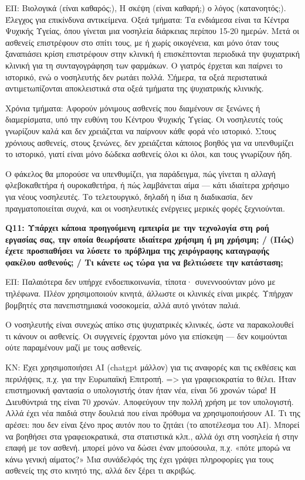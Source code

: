 ΕΠ: Βιολογικά (είναι καθαρός;),
Η σκέψη (είναι καθαρή;) ο λόγος (κατανοητός;).
Έλεγχος για επικίνδυνα αντικείμενα.
Οξεά τμήματα: Τα ενδιάμεσα είναι τα Κέντρα Ψυχικής Υγείας, όπου γίνεται μια νοσηλεία διάρκειας περίπου 15-20 ημερών. Μετά οι ασθενείς επιστρέφουν στο σπίτι τους, με ή χωρίς οικογένεια, και μόνο όταν τους ξαναπιάσει κρίση επιστρέφουν στην κλινική ή επισκέπτονται περιοδικά την ψυχιατρική κλινική για τη συνταγογράφηση των φαρμάκων.
Ο γιατρός έρχεται και παίρνει το ιστορικό, ενώ ο νοσηλευτής δεν ρωτάει πολλά. Σήμερα, τα οξεά περιστατικά αντιμετωπίζονται αποκλειστικά στα οξεά τμήματα της ψυχιατρικής κλινικής.

Χρόνια τμήματα: Αφορούν μόνιμους ασθενείς που διαμένουν σε ξενώνες ή διαμερίσματα, υπό την ευθύνη του Κέντρου Ψυχικής Υγείας. Οι νοσηλευτές τούς γνωρίζουν καλά και δεν χρειάζεται να παίρνουν κάθε φορά νέο ιστορικό. Στους χρόνιους ασθενείς, στους ξενώνες, δεν χρειάζεται κάποιος βοηθός για να υπενθυμίζει το ιστορικό, γιατί είναι μόνο δώδεκα ασθενείς όλοι κι όλοι, και τους γνωρίζουν ήδη.

Ο φάκελος θα μπορούσε να υπενθυμίζει, για παράδειγμα, πώς γίνεται η αλλαγή φλεβοκαθετήρα ή ουροκαθετήρα, ή πώς λαμβάνεται αίμα — κάτι ιδιαίτερα χρήσιμο για νέους νοσηλευτές.
Το τελετουργικό, δηλαδή η ίδια η διαδικασία, δεν πραγματοποιείται συχνά, και οι νοσηλευτικές ενέργειες μερικές φορές ξεχνιούνται.


\textbf{Q11:	Υπάρχει κάποια προηγούμενη εμπειρία με την τεχνολογία στη ροή εργασίας σας, την οποία θεωρήσατε ιδιαίτερα χρήσιμη ή μη χρήσιμη; /	(Πώς) έχετε προσπαθήσει να λύσετε το πρόβλημα της χειρόγραφης καταγραφής φακέλου ασθενούς; / Τι κάνετε ως τώρα για να βελτιώσετε την κατάσταση; } 

ΕΠ: Παλαιότερα δεν υπήρχε ενδοεπικοινωνία, τίποτα· συνεννοούνταν μόνο με τηλέφωνα.
Πλέον χρησιμοποιούν κινητά, άλλωστε οι κλινικές είναι μικρές.
Υπήρχαν βομβητές στα πανεπιστημιακά νοσοκομεία, αλλά αυτό γινόταν παλιά.

Ο νοσηλευτής είναι συνεχώς απίκο στις ψυχιατρικές κλινικές, ώστε να παρακολουθεί τι κάνουν οι ασθενείς.
Οι συγγενείς έρχονται μόνο για επίσκεψη — δεν κοιμούνται ούτε παραμένουν μαζί με τους ασθενείς.

ΚΝ: Έχει χρησιμοποιήσει ΑΙ (chatgpt μάλλον) για τις αναφορές και τις εκθέσεις και περιλήψεις, π.χ. για την Ευρωπαϊκή Επιτροπή. => για γραφειοκρατία το θέλει.
Ήταν επιστημονική φαντασία ο υπολογιστής όταν ήταν νέα, είναι 56 χρονών τώρα! Η Διευθύντριά της είναι 70 χρονών. Αποφεύγουν την πολλή χρήση με τον υπολογιστή. Αλλά έχει νέα παιδιά στην δουλειά που είναι πρόθυμα να χρησιμοποιήσουν ΑΙ.
Τι της αρέσει: που δεν είναι ξένο προς αυτόν που το ζητάει (το αποτέλεσμα του ΑΙ).
Μπορεί να βοηθήσει στα γραφειοκρατικά, στα στατιστικά κλπ., αλλά όχι στη νοσηλεία ή στην επαφή με τον ασθενή.
μπορεί μόνο να δώσει έναν μπούσουλα, π.χ. «πότε μπορώ να κάνω γενική αίματος?»
Μια συνάδελφός της έχει γράψει πληροφορίες για τους ασθενείς της στο κινητό της, αλλά δεν ξέρει τι ακριβώς.

